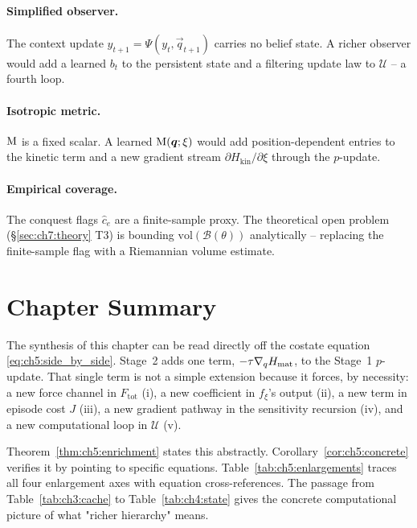 \paragraph{Simplified observer.}
The context update $y_{t+1} = \Psi(y_t,\vec{q}_{t+1})$
carries no belief state.
A richer observer would add a learned $b_t$ to the persistent state
and a filtering update law to $\mathcal{U}$ -- a fourth loop.

\paragraph{Isotropic metric.}
$\mathrm{M}$ is a fixed scalar.
A learned $\mathrm{M}(\boldsymbol{q};\xi)$ would add position-dependent entries
to the kinetic term and a new gradient stream
$\partial H_{\mathrm{kin}}/\partial\xi$ through the $p$-update.

\paragraph{Empirical coverage.}
The conquest flags $\hat{c}_e$ are a finite-sample proxy.
The theoretical open problem (§\ref{sec:ch7:theory} T3) is bounding
$\mathrm{vol}(\mathcal{B}(\theta))$ analytically -- replacing the
finite-sample flag with a Riemannian volume estimate.

\section{Chapter Summary}
\label{sec:ch5:summary}

The synthesis of this chapter can be read directly off the costate
equation \eqref{eq:ch5:side_by_side}.
Stage~2 adds one term, $-\tau\nabla_q H_{\mathrm{mat}}$,
to the Stage~1 $p$-update.
That single term is not a simple extension because it forces,
by necessity:
a new force channel in $F_{\mathrm{tot}}$ (i),
a new coefficient in $f_\xi$'s output (ii),
a new term in episode cost $J$ (iii),
a new gradient pathway in the sensitivity recursion (iv),
and a new computational loop in $\mathcal{U}$ (v).

Theorem~\ref{thm:ch5:enrichment} states this abstractly.
Corollary~\ref{cor:ch5:concrete} verifies it by pointing to specific
equations.
Table~\ref{tab:ch5:enlargements} traces all four enlargement axes
with equation cross-references.
The passage from Table~\ref{tab:ch3:cache} to Table~\ref{tab:ch4:state}
gives the concrete computational picture of what "richer hierarchy"
means.

